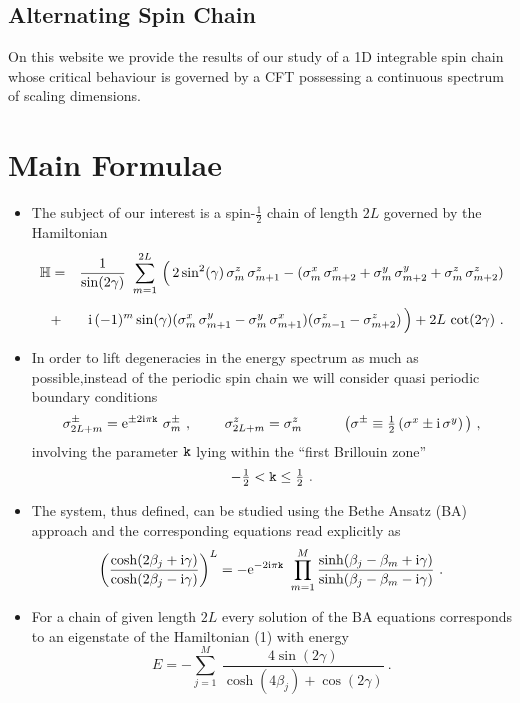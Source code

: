 \documentclass[12pt]{article}
\def\bea{\begin{eqnarray}}
\def\eea{\end{eqnarray}}
\def\be{\begin{equation}}
\def\ee{\end{equation}}
\def\be{\begin{equation}}
\def\ee{\end{equation}}
\def\bea{\begin{eqnarray}}
\def\eea{\end{eqnarray}}
\def\ri{{\rm i}}
\def\half{\textstyle\frac{1}{2}}
\newcommand{\re}{\mbox{e}}
\begin{document}
\begin{center}
\section*{Alternating Spin Chain}
\large

On this website we provide the results of  our study of a 1D integrable spin chain whose critical behaviour is governed by a CFT possessing a continuous spectrum of scaling dimensions.
\end{center}

\section{Main Formulae}
\begin{itemize}

\item
The subject of our interest is a spin-$\frac{1}{2}$ chain of length $2L$ governed by the Hamiltonian
\bea
{\mathbb H}&=&\frac{1}{\sin(2\gamma)}\
\sum_{m=1}^{2L}\,\Big(\,2\sin^2(\gamma)\, \sigma^z_m\,\sigma^z_{m+1}- (\sigma^x_m\,\sigma^x_{m+2}+\sigma^y_m\,\sigma^y_{m+2}+
\sigma^z_m\,\sigma^z_{m+2})\\[0.2cm]
&+& 
\ri\, (-1)^m\sin(\gamma)
(\sigma^x_m\,\sigma^y_{m+1}
-\sigma^y_m\,\sigma^x_{m+1})(\sigma^z_{m-1}-\sigma^z_{m+2})
\,\Big)+2L\,\cot(2\gamma)\ .
\nonumber
\eea

\item
In order to lift degeneracies in the energy spectrum as much as possible,instead of the periodic spin chain we will consider  quasi periodic boundary conditions
\bea
\sigma^{\pm}_{2L+m}=\re^{\pm 2\ri\pi{\tt k}}\ \sigma^{\pm}_{m}\ ,\ \ \ \ \ \ \ \sigma^{z}_{2L+m}=\sigma^{z}_{m}\ \ \ \ \ \ \ \ \ 
\big(\sigma^\pm\equiv\half\, (\sigma^x\pm\ri\,\sigma^y)\,\big)\ ,
\eea
involving the parameter ${\tt k}$ lying within the ``first Brillouin zone''
$$-\half < {\tt k}\leq\half \ .$$

\item
The system, thus defined, can be studied using the Bethe Ansatz (BA) approach and the corresponding 
equations read
explicitly as\cite{Lieb:1967,Baxter:1971}
\bea
\bigg(\frac{\cosh(2\beta_j+\ri\gamma)}{\cosh(2\beta_j-\ri\gamma)}
\bigg)^L=-\re^{-2\ri\pi{\tt k}}\ \prod_{m=1}^M\frac{\sinh(\beta_j-\beta_m+\ri\gamma)}{\sinh(\beta_j-\beta_m-\ri\gamma)}\ .
\eea

\item
For a chain of given length $2L$ every solution of the BA equations 
corresponds to an  eigenstate of the Hamiltonian (1) with energy
\be
E=-\sum_{j=1}^M\ \frac{4\sin(2\gamma)}{\cosh(4\beta_j)+\cos(2\gamma)}\ .
\ee


\end{itemize}
\end{document}
